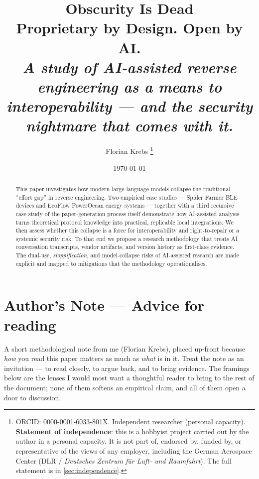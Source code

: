 \documentclass[11pt,a4paper]{article}
\title{Obscurity Is Dead\\[2pt]
  \large Proprietary by Design. Open by AI.\\[6pt]
  \normalsize\itshape A study of AI-assisted reverse engineering as a
  means to interoperability --- and the security nightmare that comes
  with it.}
\author[1]{Florian Krebs%
  \thanks{ORCID: \href{https://orcid.org/0000-0001-6033-801X}{0000-0001-6033-801X}.
  Independent researcher (personal capacity). \textbf{Statement of independence}:
  this is a hobbyist project carried out by the author in a personal capacity.
  It is not part of, endorsed by, funded by, or representative of the views of
  any employer, including the German Aerospace Center (DLR / \textit{Deutsches
  Zentrum f\"ur Luft- und Raumfahrt}). The full statement is in
  \cref{sec:independence}.}}
\affil[1]{Independent researcher (personal capacity)}
\date{\today}
\begin{document}
\maketitle

\begin{center}
\end{center}

\begin{abstract}
This paper investigates how modern large language models collapse the traditional
``effort gap'' in reverse engineering. Two empirical case studies --- Spider
Farmer BLE devices and EcoFlow PowerOcean energy systems --- together with a
third recursive case study of the paper-generation process itself demonstrate
how AI-assisted analysis turns theoretical protocol knowledge into practical,
replicable local integrations. We then assess whether this collapse is a force
for interoperability and right-to-repair or a systemic security risk. To that
end we propose a research methodology that treats AI conversation transcripts,
vendor artifacts, and version history as first-class evidence. The dual-use,
\emph{sloppification}, and model-collapse risks of AI-assisted research are
made explicit and mapped to mitigations that the methodology operationalises.
\end{abstract}

\section*{Author's Note --- Advice for reading}
\label{sec:authors-note}

\noindent A short methodological note from me (Florian Krebs), placed
up-front because \emph{how} you read this paper matters as much as
\emph{what} is in it. Treat the note as an invitation --- to read
closely, to argue back, and to bring evidence. The framings below are
the lenses I would most want a thoughtful reader to bring to the rest
of the document; none of them softens an empirical claim, and all of
them open a door to discussion.
\end{document}
